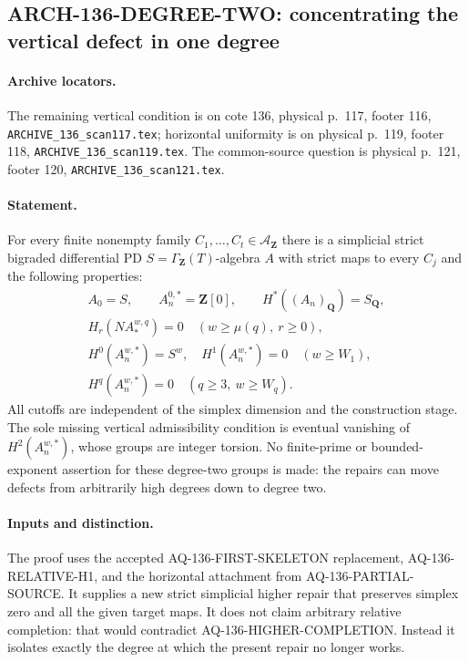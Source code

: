 \subsection{ARCH-136-DEGREE-TWO: concentrating the vertical defect in one degree}
\label{sec:arch136degreetwo}

\paragraph{Archive locators.}
The remaining vertical condition is on cote 136, physical p.~117,
footer 116, \texttt{ARCHIVE\_136\_scan117.tex}; horizontal uniformity
is on physical p.~119, footer 118, \texttt{ARCHIVE\_136\_scan119.tex}.
The common-source question is physical p.~121, footer 120,
\texttt{ARCHIVE\_136\_scan121.tex}.

\paragraph{Statement.}
For every finite nonempty family
$C_1,\ldots,C_t\in\mathcal A_{\mathbf Z}$ there is a simplicial
strict bigraded differential PD $S=\Gamma_{\mathbf Z}(T)$-algebra
$A$ with strict maps to every $C_j$ and the following properties:
\[
 \begin{gathered}
 A_0=S,\qquad A_n^{0,*}=\mathbf Z[0],\qquad
 H^*((A_n)_{\mathbf Q})=S_{\mathbf Q},\\
 H_r(NA_*^{w,q})=0\quad(w\geq\mu(q),\ r\geq0),\\
 H^0(A_n^{w,*})=S^w,\quad H^1(A_n^{w,*})=0
                                      \quad(w\geq W_1),\\
 H^q(A_n^{w,*})=0\quad(q\geq3,\ w\geq W_q).
 \end{gathered}                                           \tag{136.DT1}
\]
All cutoffs are independent of the simplex dimension and the
construction stage.  The sole missing vertical admissibility
condition is eventual vanishing of $H^2(A_n^{w,*})$, whose groups
are integer torsion.  No finite-prime or bounded-exponent assertion
for these degree-two groups is made: the repairs can move defects
from arbitrarily high degrees down to degree two.

\paragraph{Inputs and distinction.}
The proof uses the accepted AQ-136-FIRST-SKELETON replacement,
AQ-136-RELATIVE-H1, and the horizontal attachment from
AQ-136-PARTIAL-SOURCE.  It supplies a new strict simplicial higher
repair that preserves simplex zero and all the given target maps.
It does not claim arbitrary relative completion: that would
contradict AQ-136-HIGHER-COMPLETION.  Instead it isolates exactly
the degree at which the present repair no longer works.

